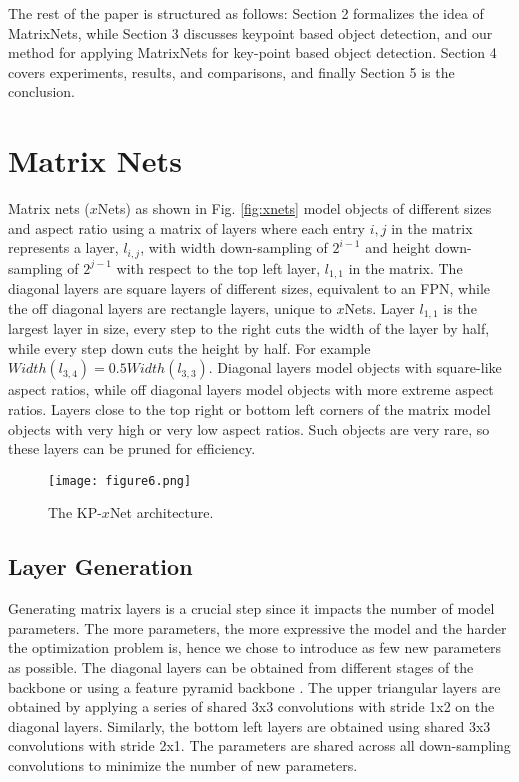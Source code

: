 \documentclass[10pt,twocolumn,letterpaper]{article}
\begin{document}
The rest of the paper is structured as follows: Section 2 formalizes the idea of MatrixNets, while Section 3 discusses keypoint based object detection, and our method for applying MatrixNets for key-point based object detection. Section 4 covers experiments, results, and comparisons, and finally Section 5 is the conclusion.


\section{Matrix Nets}
\vspace{-0.25cm}
Matrix nets ($x$Nets) as shown in Fig. \ref{fig:xnets} model objects of different sizes and aspect ratio using a matrix of layers where each entry $i,j$ in the matrix represents a layer, $l_{i,j}$, with width down-sampling of $2^{i-1}$ and height down-sampling of $2^{j-1}$ with respect to the top left layer, $l_{1,1}$ in the matrix.  The diagonal layers are square layers of different sizes, equivalent to an FPN, while the off diagonal layers are rectangle layers, unique to $x$Nets. Layer $l_{1,1}$ is the largest layer in size, every step to the right cuts the width of the layer by half, while every step down cuts the height by half. For example $Width(l_{3,4}) =  0.5 Width(l_{3,3})$. Diagonal layers model objects with square-like aspect ratios, while off diagonal layers model objects with more extreme aspect ratios. Layers close to the top right or bottom left corners of the matrix model objects with very high or very low aspect ratios. Such objects are very rare, so these layers can be pruned for efficiency.

\begin{figure}[t]
\begin{center}
\texttt{[image: figure6.png]}
\end{center}
\vspace{-0.25cm}
  \caption{The KP-$x$Net architecture.}
\label{fig:long}
\label{fig:KPxNet}
\vspace{-0.5cm}
\end{figure}
\subsection{Layer Generation}
\vspace{-0.25cm}
Generating matrix layers is a crucial step since it impacts the number of model parameters. The more parameters, the more expressive the model and the harder the optimization problem is, hence we chose to introduce as few new parameters as possible. The diagonal layers can be obtained from different stages of the backbone or using a feature pyramid backbone  \cite{lin2017feature}. The upper triangular layers are obtained by applying a series of shared 3x3 convolutions with stride 1x2 on the diagonal layers. Similarly, the bottom left layers are obtained using shared 3x3 convolutions with stride 2x1. The parameters are shared across all down-sampling convolutions to minimize the number of new parameters.
\end{document}

